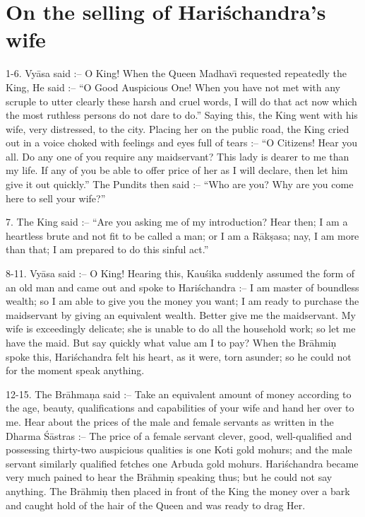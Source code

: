 \chapter{On the selling of Hari\'schandra's wife}

1-6. Vy\=asa said :-- O King! When the Queen Madhav\={\i} requested repeatedly the King, He said :-- ``O Good Auspicious One! When you have not met with any scruple to utter clearly these harsh and cruel words, I will do that act now which the most ruthless persons do not dare to do.'' Saying this, the King went with his wife, very distressed, to the city. Placing her on the public road, the King cried out in a voice choked with feelings and eyes full of tears :-- ``O Citizens! Hear you all. Do any one of you require any maidservant? This lady is dearer to me than my life. If any of you be able to offer price of her as I will declare, then let him give it out quickly.'' The Pundits then said :-- ``Who are you? Why are you come here to sell your wife?''

7. The King said :-- ``Are you asking me of my introduction? Hear then; I am a heartless brute and not fit to be called a man; or I am a R\=ak\d{s}asa; nay, I am more than that; I am prepared to do this sinful act.''

8-11. Vy\=asa said :-- O King! Hearing this, Kau\'sika suddenly assumed the form of an old man and came out and spoke to Hari\'schandra :-- I am master of boundless wealth; so I am able to give you the money you want; I am ready to purchase the maidservant by giving an equivalent wealth. Better give me the maidservant. My wife is exceedingly delicate; she is unable to do all the household work; so let me have the maid. But say quickly what value am I to pay? When the Br\=ahmi\d{n} spoke this, Hari\'schandra felt his heart, as it were, torn asunder; so he could not for the moment speak anything.

12-15. The Br\=ahma\d{n}a said :-- Take an equivalent amount of money according to the age, beauty, qualifications and capabilities of your wife and hand her over to me. Hear about the prices of the male and female servants as written in the Dharma \'S\=astras :-- The price of a female servant clever, good, well-qualified and possessing thirty-two auspicious qualities is one Koti gold mohurs; and the male servant similarly qualified fetches one Arbuda gold mohurs. Hari\'schandra became very much pained to hear the Br\=ahmi\d{n} speaking thus; but he could not say anything. The Br\=ahmi\d{n} then placed in front of the King the money over a bark and caught hold of the hair of the Queen and was ready to drag Her.

